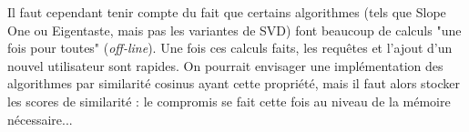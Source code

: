 \documentclass[11pt, openany, a4paper]{article}
\begin{document}
		Il faut cependant tenir compte du fait que certains algorithmes (tels que Slope One ou Eigentaste, mais pas les variantes de SVD) font beaucoup de calculs "une fois pour toutes" (\emph{off-line}). Une fois ces calculs faits, les requêtes et l'ajout d'un nouvel utilisateur sont rapides. On pourrait envisager une implémentation des algorithmes par similarité cosinus ayant cette propriété, mais il faut alors stocker les scores de similarité : le compromis se fait cette fois au niveau de la mémoire nécessaire...
		


\end{document}
